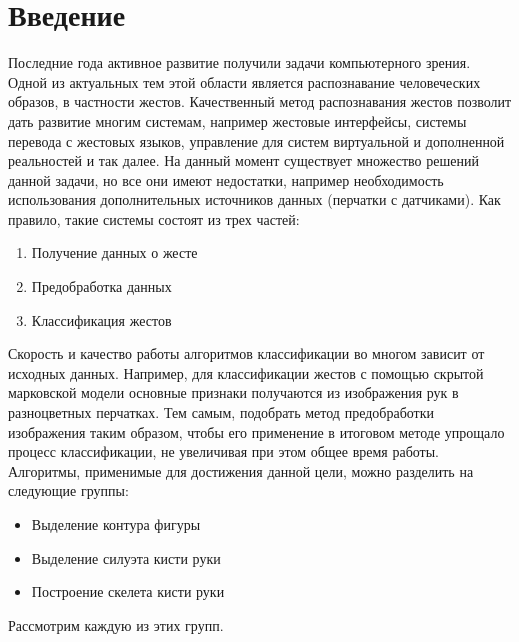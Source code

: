 \section{Введение}
\label{sec:Intro}

Последние года активное развитие получили задачи компьютерного зрения. Одной из актуальных тем этой области является распознавание человеческих образов, в частности жестов. Качественный метод распознавания жестов позволит дать развитие многим системам, например жестовые интерфейсы, системы перевода с жестовых языков, управление для систем виртуальной и дополненной реальностей и так далее. На данный момент существует множество решений данной задачи\cite{slr}, но все они имеют недостатки, например необходимость использования дополнительных источников данных (перчатки с датчиками). 
Как правило, такие системы состоят из трех частей:

\begin{enumerate}
	\item Получение данных о жесте
	\item Предобработка данных
	\item Классификация жестов
\end{enumerate}

Скорость и качество работы алгоритмов классификации во многом зависит от исходных данных. Например, для классификации жестов с помощью скрытой марковской модели \cite{inproceedings} основные признаки получаются из изображения рук в разноцветных перчатках. Тем самым, подобрать метод предобработки изображения таким образом, чтобы его применение в итоговом методе упрощало процесс классификации, не увеличивая при этом общее время работы. Алгоритмы, применимые для достижения данной цели, можно разделить на следующие группы:
\begin{itemize}
	\item Выделение контура фигуры
	\item Выделение силуэта кисти руки
	\item Построение скелета кисти руки
\end{itemize}

Рассмотрим каждую из этих групп.